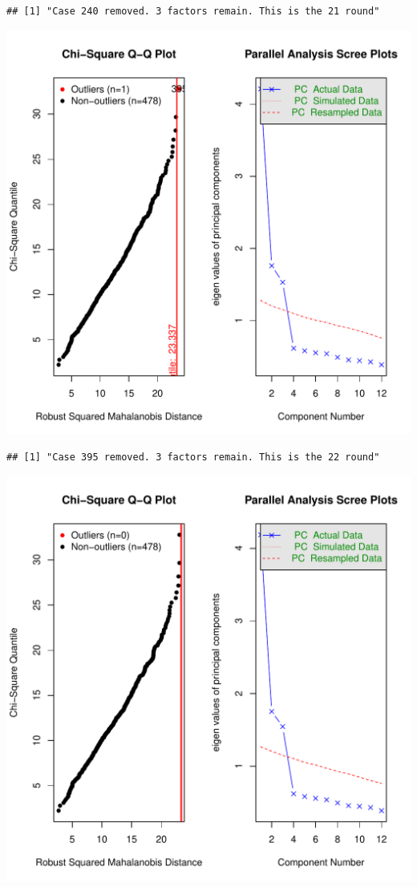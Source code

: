 \documentclass{article}\usepackage[]{graphicx}\usepackage[]{color}
\makeatletter
\def\maxwidth{ %
  \ifdim\Gin@nat@width>\linewidth
    \linewidth
  \else
    \Gin@nat@width
  \fi
}
\newenvironment{kframe}{%
 \def\at@end@of@kframe{}%
 \ifinner\ifhmode%
  \def\at@end@of@kframe{\end{minipage}}%
  \begin{minipage}{\columnwidth}%
 \fi\fi%
 \def\FrameCommand##1{\hskip\@totalleftmargin \hskip-\fboxsep
 \colorbox{shadecolor}{##1}\hskip-\fboxsep
     \hskip-\linewidth \hskip-\@totalleftmargin \hskip\columnwidth}%
 \MakeFramed {\advance\hsize-\width
   \@totalleftmargin\z@ \linewidth\hsize
   \@setminipage}}%
 {\par\unskip\endMakeFramed%
 \at@end@of@kframe}
\newenvironment{knitrout}{}{} %
\makeatother
\begin{document}
\begin{knitrout}
\begin{kframe}\begin{verbatim}
## [1] "Case 240 removed. 3 factors remain. This is the 21 round"
\end{verbatim}
\end{kframe}
\includegraphics[width=\maxwidth]{figure/unnamed-chunk-10-22} 
\begin{kframe}\begin{verbatim}
## [1] "Case 395 removed. 3 factors remain. This is the 22 round"
\end{verbatim}
\end{kframe}
\includegraphics[width=\maxwidth]{figure/unnamed-chunk-10-23} 

\end{knitrout}
\end{document}
